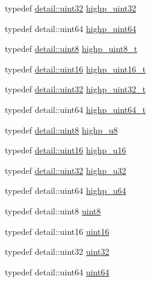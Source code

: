 \begin{DoxyCompactItemize}
typedef \hyperlink{stb__image_8c_a1134b580f8da4de94ca6b1de4d37975e}{detail\+::uint32} \hyperlink{group__gtc__type__precision_ga3145e44c73e2df7dfe4f3cb65974bf22}{highp\+\_\+uint32}
\item 
typedef detail\+::uint64 \hyperlink{group__gtc__type__precision_ga8079c653e20cda03d34b99de629a7b09}{highp\+\_\+uint64}
\item 
typedef \hyperlink{stb__image_8c_adde6aaee8457bee49c2a92621fe22b79}{detail\+::uint8} \hyperlink{group__gtc__type__precision_ga9ba529fcc75b82d23da979f0ce6e4518}{highp\+\_\+uint8\+\_\+t}
\item 
typedef \hyperlink{stb__image_8c_a05f6b0ae8f6a6e135b0e290c25fe0e4e}{detail\+::uint16} \hyperlink{group__gtc__type__precision_ga3145bc0ee80432c165e985a188a722b3}{highp\+\_\+uint16\+\_\+t}
\item 
typedef \hyperlink{stb__image_8c_a1134b580f8da4de94ca6b1de4d37975e}{detail\+::uint32} \hyperlink{group__gtc__type__precision_ga8eb85ad460079c63b68866ae34637bda}{highp\+\_\+uint32\+\_\+t}
\item 
typedef detail\+::uint64 \hyperlink{group__gtc__type__precision_ga6e66f40c5909bfc872b068187fa6029e}{highp\+\_\+uint64\+\_\+t}
\item 
typedef \hyperlink{stb__image_8c_adde6aaee8457bee49c2a92621fe22b79}{detail\+::uint8} \hyperlink{group__gtc__type__precision_ga8a60abe782749c504fb5ae51eb8b49cc}{highp\+\_\+u8}
\item 
typedef \hyperlink{stb__image_8c_a05f6b0ae8f6a6e135b0e290c25fe0e4e}{detail\+::uint16} \hyperlink{group__gtc__type__precision_ga9da2178d7501d9c0f225fa1a7b70cb45}{highp\+\_\+u16}
\item 
typedef \hyperlink{stb__image_8c_a1134b580f8da4de94ca6b1de4d37975e}{detail\+::uint32} \hyperlink{group__gtc__type__precision_gae8e8a2c712653891a03c171795286ac5}{highp\+\_\+u32}
\item 
typedef detail\+::uint64 \hyperlink{group__gtc__type__precision_ga6006ea883d3c0491791650b2fb84de39}{highp\+\_\+u64}
\item 
typedef detail\+::uint8 \hyperlink{group__gtc__type__precision_ga1a7dcd8aac97cc8020817c94049deff2}{uint8}
\item 
typedef detail\+::uint16 \hyperlink{group__gtc__type__precision_gad8c2939e1fdd8e5828b31d95c52255d5}{uint16}
\item 
typedef detail\+::uint32 \hyperlink{group__gtc__type__precision_ga202b6a53c105fcb7e531f9b443518451}{uint32}
\item 
typedef detail\+::uint64 \hyperlink{group__gtc__type__precision_gae3632bf9b37da66233d78930dd06378a}{uint64}

\end{DoxyCompactItemize}

